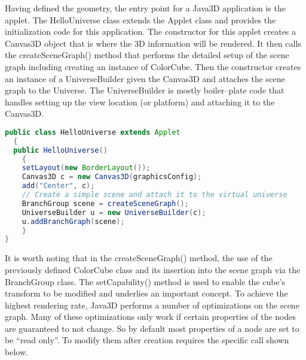 Having defined the geometry, the entry point for a Java3D application is the applet. The HelloUniverse class extends the Applet class and provides the initialization code for this application. The constructor for this applet creates a Canvas3D object that is where the 3D information will be rendered. It then calls the createSceneGraph() method that performs the detailed setup of the scene graph including creating an instance of ColorCube. Then the constructor creates an instance of a UniverseBuilder given the Canvas3D and attaches the scene graph to the Universe. The UniverseBuilder is mostly boiler--plate code that handles setting up the view location (or platform) and attaching it to the Canvas3D.

\begin{lstlisting}[language=Java, caption={}, numbers=none, frame=none]
public class HelloUniverse extends Applet
  {
  public HelloUniverse()
    {
    setLayout(new BorderLayout());
    Canvas3D c = new Canvas3D(graphicsConfig);
    add("Center", c);
    // Create a simple scene and attach it to the virtual universe
    BranchGroup scene = createSceneGraph();
    UniverseBuilder u = new UniverseBuilder(c);
    u.addBranchGraph(scene);
    }
}
\end{lstlisting}

It is worth noting that in the createSceneGraph() method, the use of the previously defined ColorCube class and its insertion into the scene graph via the BranchGroup class. The setCapability() method is used to enable the cube's transform to be modified and underlies an important concept. To achieve the highest rendering rate, Java3D performs a number of optimizations on the scene graph. Many of these optimizations only work if certain properties of the nodes are guaranteed to not change. So by default most properties of a node are set to be ``read only''. To modify them after creation requires the specific call shown below.

